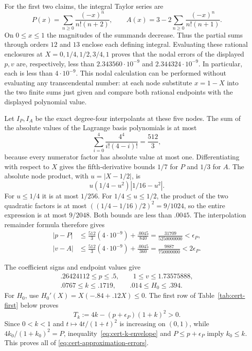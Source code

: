 For the first two claims, the integral Taylor series are
\[
 P(x)=\sum_{n\ge0}\frac{(-x)^n}{n!(n+2)},\qquad
 A(x)=3-2\sum_{n\ge0}\frac{(-x)^n}{n!(n+1)}.
\]
On $0\le x\le1$ the magnitudes of the summands decrease.  Thus the
partial sums through orders $12$ and $13$ enclose each defining
integral.  Evaluating these rational enclosures at
$X=0,1/4,1/2,3/4,1$ proves that the nodal errors of the displayed
$p,v$ are, respectively, less than
$2.343560\cdot10^{-9}$ and $2.344324\cdot10^{-9}$.  In particular,
each is less than $4\cdot10^{-9}$.  This nodal calculation can be
performed without evaluating any transcendental number: at each node
substitute $x=1-X$ into the two finite sums just given and compare
both rational endpoints with the displayed polynomial value.

Let $I_P,I_A$ be the exact degree-four interpolants at these five nodes.
The sum of the absolute values of the Lagrange basis polynomials is at
most
\[
 \sum_{i=0}^4\frac{4^4}{i!(4-i)!}=\frac{512}{3},
\]
because every numerator factor has absolute value at most one.
Differentiating with respect to $X$ gives the fifth-derivative bounds
$1/7$ for $P$ and $1/3$ for $A$.  The absolute node product, with
$u=|X-1/2|$, is
\[
 u(1/4-u^2)|1/16-u^2|.
\]
For $u\le1/4$ it is at most $1/256$.  For $1/4\le u\le1/2$, the
product of the two quadratic factors is at most
$((1/4-1/16)/2)^2=9/1024$, so the entire expression is at most
$9/2048$.  Both bounds are less than $.0045$.  The interpolation
remainder formula therefore gives
\begin{align*}
 |p-P|&\le\frac{512}{3}(4\cdot10^{-9})+\frac{.0045}{840}
       =\frac{31709}{5250000000}<\epsilon_P,\\
 |v-A|&\le\frac{512}{3}(4\cdot10^{-9})+\frac{.0045}{360}
       =\frac{9887}{750000000}<2\epsilon_P.
\end{align*}

The coefficient signs and endpoint values give
\begin{equation}
\begin{gathered}
 .26424112\le p\le.5,\qquad 1\le v\le1.73575888,\\
 .0767\le k\le.1719,\qquad .014\le H_0\le.394.
\end{gathered}
\label{eq:cert-polynomial-ranges}
\end{equation}
For $H_0$, use $H_0'(X)=X(-.84+.12X)\le0$.
The first row of Table~\ref{tab:cert-first} below proves
\begin{equation}
 T_k:=4k-(p+\epsilon_P)(1+k)^2>0.
 \label{eq:cert-k-envelope}
\end{equation}
Since $0<k<1$ and $t\mapsto4t/(1+t)^2$ is increasing on $(0,1)$,
while $4k_0/(1+k_0)^2=P$, inequality~\eqref{eq:cert-k-envelope}
and $P\le p+\epsilon_P$ imply $k_0\le k$.  This proves all of
\eqref{eq:cert-approximation-errors}.

